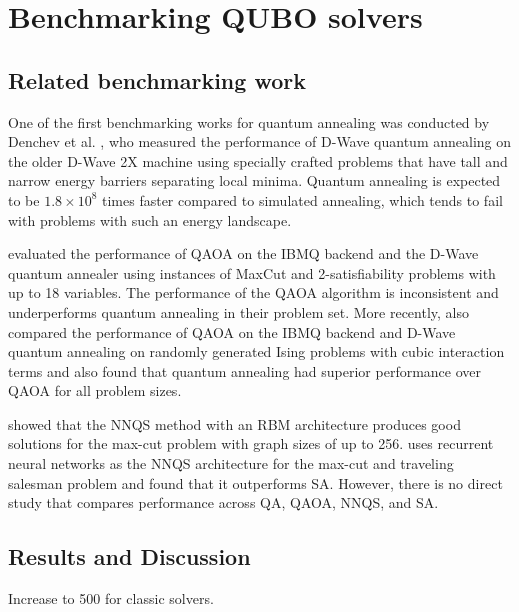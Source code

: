 \chapter{Benchmarking QUBO solvers}\label{benchmark}

\section{Related benchmarking work}
One of the first benchmarking works for quantum annealing was conducted by Denchev et al. , who measured the performance of D-Wave quantum annealing on the older D-Wave 2X machine using specially crafted problems that have tall and narrow energy barriers separating local minima. Quantum annealing is expected to be $1.8 \times 10^8$ times faster compared to simulated annealing, which tends to fail with problems with such an energy landscape.


 evaluated the performance of QAOA on the IBMQ backend and the D-Wave quantum annealer using instances of MaxCut and 2-satisfiability problems with up to 18 variables. The performance of the QAOA algorithm is inconsistent and underperforms quantum annealing in their problem set. More recently,  also compared the performance of QAOA on the IBMQ backend and D-Wave quantum annealing on randomly generated Ising problems with cubic interaction terms and also found that quantum annealing had superior performance over QAOA for all problem sizes. 

 showed that the NNQS method with an RBM architecture produces good solutions for the max-cut problem with graph sizes of up to 256.  uses recurrent neural networks as the NNQS architecture for the max-cut and traveling salesman problem and found that it outperforms SA. However, there is no direct study that compares performance across QA, QAOA, NNQS, and SA.

\section{Results and Discussion}
Increase to 500 for classic solvers.

